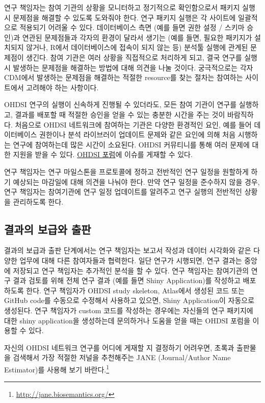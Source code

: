 \documentclass[11pt]{book}
\let\rmarkdownfootnote\footnote%
\def\footnote{\protect\rmarkdownfootnote}
\theoremstyle{definition}
\theoremstyle{definition}
\theoremstyle{definition}
\theoremstyle{remark}
\let\BeginKnitrBlock\begin \let\EndKnitrBlock\end
\begin{document}
연구 책임자는 참여 기관의 상황을 모니터하고 정기적으로 확인함으로서
패키지 실행시 문제점을 해결할 수 있도록 도와줘야 한다. 연구 패키지
실행은 각 사이트에 일괄적으로 적용되기 어려울 수 있다. 데이터베이스 측면
(예를 들면 권한 설정 / 스키마 승인)과 연관된 문제점들과 각자의 환경이
달라서 생기는 (예를 들면, 필요한 패키지가 설치되지 않거나, R에서
데이터베이스에 접속이 되지 않는 등) 분석툴 실행에 관계된 문제점이
생긴다. 참여 기관은 여러 상황을 직접적으로 처리하게 되고, 결국 연구를
실행시 발생하는 문제점을 해결하는 방법에 대해 의견을 나눌 것이다.
궁극적으로는 각자 CDM에서 발생하는 문제점을 해결하는 적절한 resource를
찾는 절차는 참여하는 사이트에서 고려해야 하는 사항이다.

OHDSI 연구의 실행이 신속하게 진행될 수 있더라도, 모든 참여 기관이 연구를
실행하고, 결과를 배포할 때 적절한 승인을 얻을 수 있는 충분한 시간을 주는
것이 바람직하다. 처음으로 OHDSI 네트워크에 참여하는 기관은 다양한
환경적인 요인, 예를 들어 데이터베이스 권한이나 분석 라이브러이 업데이트
문제와 같은 요인에 의해 처음 시행하는 연구에 참여하는데 많은 시간이
소요된다. OHDSI 커뮤티니를 통해 여러 문제에 대한 지원을 받을 수 있다.
\href{http://forums.ohdsi.org}{OHDSI 포럼}에 이슈를 게재할 수 있다.

연구 책임자는 연구 마일스톤을 프로토콜에 정하고 전반적인 연구 일정을
원할하게 하기 예상되는 마감일에 대해 의견을 나눠야 한다. 만약 연구
일정을 준수하지 않을 경우, 연구 책임자는 참여기관에 연구 일정 업데이트를
알려주고 연구 실행의 전반적인 상황을 관리하도록 한다.

\subsection{결과의 보급와 출판}\label{--}

결과의 보급과 출판 단계에서는 연구 책임자는 보고서 작성과 데이터
시각화와 같은 다양한 업무에 대해 다른 참여자들과 협력한다. 일단 연구가
시행되면, 연구 결과는 중앙에 저장되고 연구 책임자는 추가적인 분석을 할
수 있다. 연구 책임자는 참여기관의 연구 결과 검토를 위해 전체 연구 결과
(예를 들면 Shiny Application)를 작성하고 배포하도록 한다. 연구 책임자가
OHDSI study skeleton, Atlas에서 생성된 코드 또는 GitHub code를 수동으로
수정해서 사용하고 있으면, Shiny Application이 자동으로 생성된다. 연구
책임자가 custom 코드를 작성하는 경우에는 자신들의 연구 패키지에 대한
shiny application을 생성하는데 문의하거나 도움을 얻을 때는 OHDSI 포럼을
이용할 수 있다.

\BeginKnitrBlock{rmdimportant}
자신의 OHDSI 네트워크 연구를 어디에 게재할 지 결정하기 어려우면, 초록과
출판물을 검색해서 가장 적절한 저널을 추천해주는 JANE (Journal/Author
Name Estimator)를 사용해 보기 바란다.\footnote{\url{http://jane.biosemantics.org/}}
\EndKnitrBlock{rmdimportant}
\end{document}
